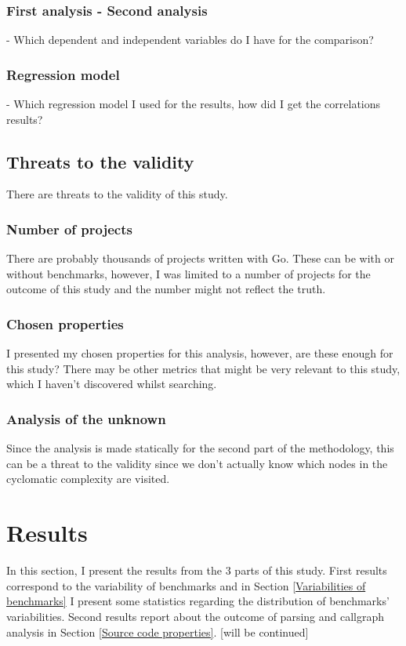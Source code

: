 \documentclass{seal_thesis}
\begin{document}
\subsection{First analysis - Second analysis}
- Which dependent and independent variables do I have for the comparison?
\subsection{Regression model}
- Which regression model I used for the results, how did I get the correlations results?

\section{Threats to the validity}
There are threats to the validity of this study.
\subsection{Number of projects}
There are probably thousands of projects written with Go. These can be with or without benchmarks, however, I was limited to a number of projects for the outcome of this study and the number might not reflect the truth.

\subsection{Chosen properties}
I presented my chosen properties for this analysis, however, are these enough for this study? There may be other metrics that might be very relevant to this study, which I haven't discovered whilst searching.

\subsection{Analysis of the unknown}
Since the analysis is made statically for the second part of the methodology, this can be a threat to the validity since we don't actually know which nodes in the cyclomatic complexity are visited.


\chapter{Results}
\label{Results}
In this section, I present the results from the 3 parts of this study. First results correspond to the variability of benchmarks and in Section \ref{Variabilities of benchmarks} I present some statistics regarding the distribution of benchmarks' variabilities. Second results report about the outcome of parsing and callgraph analysis in Section \ref{Source code properties}. [will be continued]
\end{document}
